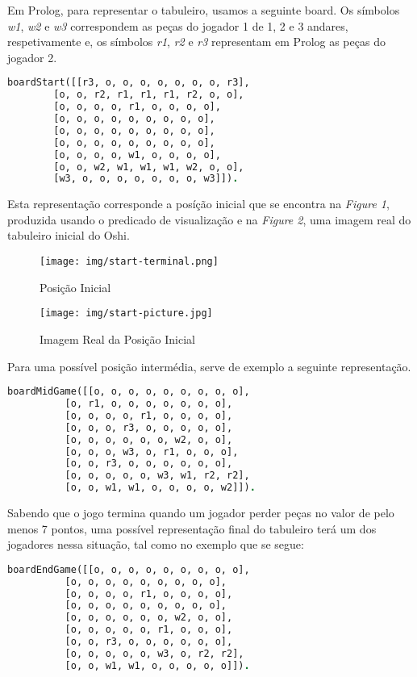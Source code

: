 \documentclass[a4paper]{article}
\begin{document}
Em Prolog, para representar o tabuleiro, usamos a seguinte board. Os símbolos \textit{w1}, \textit{w2} e \textit{w3} correspondem as peças do jogador 1 de 1, 2 e 3 andares, respetivamente e, os símbolos \textit{r1}, \textit{r2} e \textit{r3} representam em Prolog as peças do jogador 2.
\bigskip
\begin{lstlisting}[language=Prolog]
boardStart([[r3, o, o, o, o, o, o, o, r3],
	    [o, o, r2, r1, r1, r1, r2, o, o],
	    [o, o, o, o, r1, o, o, o, o],
	    [o, o, o, o, o, o, o, o, o],
	    [o, o, o, o, o, o, o, o, o],
	    [o, o, o, o, o, o, o, o, o],
	    [o, o, o, o, w1, o, o, o, o],
	    [o, o, w2, w1, w1, w1, w2, o, o],
	    [w3, o, o, o, o, o, o, o, w3]]).
\end{lstlisting}
\bigskip
Esta representação corresponde a posíção inicial que se encontra na \textit{Figure 1}, produzida usando o predicado de visualização e na \textit{Figure 2}, uma imagem real do tabuleiro inicial do Oshi.

\begin{figure}[h!]
\centering
\begin{minipage}{.4\textwidth}
  \centering
  \texttt{[image: img/start-terminal.png]}
  \caption{Posição Inicial}
  \label{fig:start}
\end{minipage}%
\begin{minipage}{.4\textwidth}
  \centering
  \texttt{[image: img/start-picture.jpg]}
  \caption{Imagem Real da Posição Inicial}
  \label{fig:real-pic}
\end{minipage}
\end{figure}
\clearpage
Para uma possível posição intermédia, serve de exemplo a seguinte representação.
\bigskip
\begin{lstlisting}[language=Prolog]
boardMidGame([[o, o, o, o, o, o, o, o, o],
	      [o, r1, o, o, o, o, o, o, o],
	      [o, o, o, o, r1, o, o, o, o],
	      [o, o, o, r3, o, o, o, o, o],
	      [o, o, o, o, o, o, w2, o, o],
	      [o, o, o, w3, o, r1, o, o, o],
	      [o, o, r3, o, o, o, o, o, o],
	      [o, o, o, o, o, w3, w1, r2, r2],
	      [o, o, w1, w1, o, o, o, o, w2]]).
\end{lstlisting}

\bigskip
Sabendo que o jogo termina quando um jogador perder peças no valor de pelo menos 7 pontos, uma possível representação final do tabuleiro terá um dos jogadores nessa situação, tal como no exemplo que se segue:

\bigskip

\begin{lstlisting}[language=Prolog]
boardEndGame([[o, o, o, o, o, o, o, o, o],
	      [o, o, o, o, o, o, o, o, o],
	      [o, o, o, o, r1, o, o, o, o],
	      [o, o, o, o, o, o, o, o, o],
	      [o, o, o, o, o, o, w2, o, o],
	      [o, o, o, o, o, r1, o, o, o],
	      [o, o, r3, o, o, o, o, o, o],
	      [o, o, o, o, o, w3, o, r2, r2],
	      [o, o, w1, w1, o, o, o, o, o]]).
\end{lstlisting}
\end{document}
